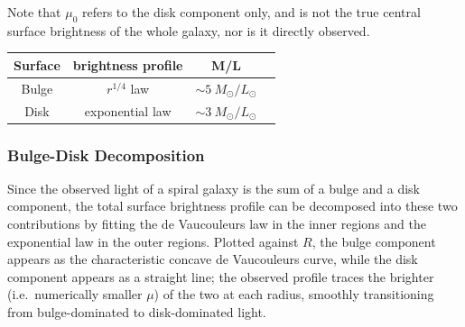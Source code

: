 Note that $\mu_0$ refers to the disk component only, and is not the true central surface brightness of the whole galaxy, nor is it directly observed.

\medskip

\begin{center}
    \begin{tabular}{cccc}
        \toprule
        Surface & brightness profile & M/L\\
        \midrule
        Bulge & $r^{1/4}$ law & $\sim 5\ M_\odot/L_\odot$\\
        Disk & exponential law & $\sim 3\ M_\odot/L_\odot$\\
        \bottomrule
    \end{tabular}
\end{center}

\subsubsection{Bulge-Disk Decomposition}

Since the observed light of a spiral galaxy is the sum of a bulge and a disk component, the total surface brightness profile can be decomposed into these two contributions by fitting the de Vaucouleurs law in the inner regions and the exponential law in the outer regions. Plotted against $R$, the bulge component appears as the characteristic concave de Vaucouleurs curve, while the disk component appears as a straight line; the observed profile traces the brighter (i.e.\ numerically smaller $\mu$) of the two at each radius, smoothly transitioning from bulge-dominated to disk-dominated light.

\medskip

